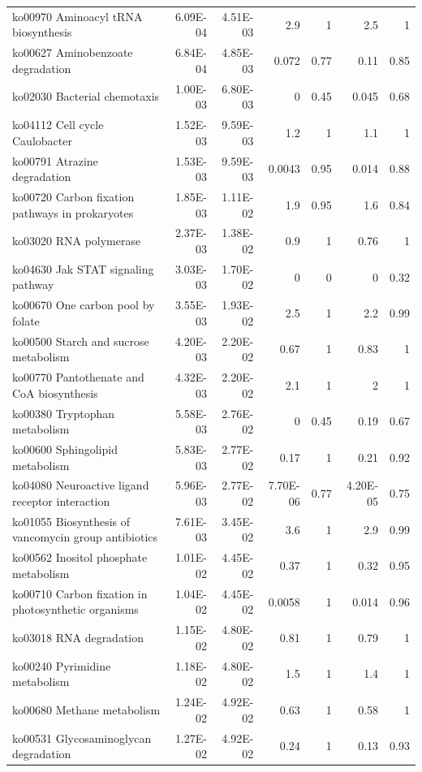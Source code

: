 {\begin{longtable}{ | l | r | r | r | r | r | r  | }
		ko00970 Aminoacyl tRNA biosynthesis & 6.09E-04 & 4.51E-03 & 2.9 & 1 & 2.5 & 1\\ 
		ko00627 Aminobenzoate degradation & 6.84E-04 & 4.85E-03 & 0.072 & 0.77 & 0.11 & 0.85\\ 
		ko02030 Bacterial chemotaxis & 1.00E-03 & 6.80E-03 & 0 & 0.45 & 0.045 & 0.68\\ 
		ko04112 Cell cycle Caulobacter & 1.52E-03 & 9.59E-03 & 1.2 & 1 & 1.1 & 1\\ 
		ko00791 Atrazine degradation & 1.53E-03 & 9.59E-03 & 0.0043 & 0.95 & 0.014 & 0.88\\ 
		ko00720 Carbon fixation pathways in prokaryotes & 1.85E-03 & 1.11E-02 & 1.9 & 0.95 & 1.6 & 0.84\\ 
		ko03020 RNA polymerase & 2.37E-03 & 1.38E-02 & 0.9 & 1 & 0.76 & 1\\ 
		ko04630 Jak STAT signaling pathway & 3.03E-03 & 1.70E-02 & 0 & 0 & 0 & 0.32\\ 
		ko00670 One carbon pool by folate & 3.55E-03 & 1.93E-02 & 2.5 & 1 & 2.2 & 0.99\\ 
		ko00500 Starch and sucrose metabolism & 4.20E-03 & 2.20E-02 & 0.67 & 1 & 0.83 & 1\\ 
		ko00770 Pantothenate and CoA biosynthesis & 4.32E-03 & 2.20E-02 & 2.1 & 1 & 2 & 1\\ 
		ko00380 Tryptophan metabolism & 5.58E-03 & 2.76E-02 & 0 & 0.45 & 0.19 & 0.67\\ 
		ko00600 Sphingolipid metabolism & 5.83E-03 & 2.77E-02 & 0.17 & 1 & 0.21 & 0.92\\ 
		ko04080 Neuroactive ligand receptor interaction & 5.96E-03 & 2.77E-02 & 7.70E-06 & 0.77 & 4.20E-05 & 0.75\\ 
		ko01055 Biosynthesis of vancomycin group antibiotics & 7.61E-03 & 3.45E-02 & 3.6 & 1 & 2.9 & 0.99\\ 
		ko00562 Inositol phosphate metabolism & 1.01E-02 & 4.45E-02 & 0.37 & 1 & 0.32 & 0.95\\ 
		ko00710 Carbon fixation in photosynthetic organisms & 1.04E-02 & 4.45E-02 & 0.0058 & 1 & 0.014 & 0.96\\ 
		ko03018 RNA degradation & 1.15E-02 & 4.80E-02 & 0.81 & 1 & 0.79 & 1\\ 
		ko00240 Pyrimidine metabolism & 1.18E-02 & 4.80E-02 & 1.5 & 1 & 1.4 & 1\\ 
		ko00680 Methane metabolism & 1.24E-02 & 4.92E-02 & 0.63 & 1 & 0.58 & 1\\ 
		ko00531 Glycosaminoglycan degradation & 1.27E-02 & 4.92E-02 & 0.24 & 1 & 0.13 & 0.93\\ 

\end{longtable}}
